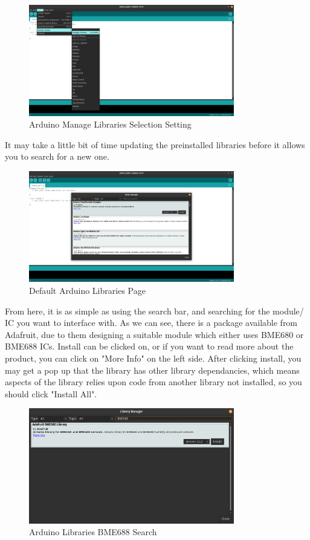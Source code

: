 \documentclass[a4paper,11pt]{report}
\begin{document}
\begin{figure}[H]
\centering
\includegraphics[width=0.8\textwidth]{screenshots/arduinomanagelibrariesselect}
\caption{Arduino Manage Libraries Selection Setting}
\end{figure}

It may take a little bit of time updating the preinstalled libraries before it allows you to search for a new one.

\begin{figure}[H]
\centering
\includegraphics[width=0.8\textwidth]{screenshots/arduinolibrariespage}
\caption{Default Arduino Libraries Page}
\end{figure}

From here, it is as simple as using the search bar, and searching for the module/ IC you want to interface with. As we can see, there is a package available from Adafruit, due to them designing a suitable module which either uses BME680 or BME688 ICs. Install can be clicked on, or if you want to read more about the product, you can click on "More Info" on the left side. After clicking install, you may get a pop up that the library has other library dependancies, which means aspects of the library relies upon code from another library not installed, so you should click "Install All".

\begin{figure}[H]
\centering
\includegraphics[width=0.8\textwidth]{screenshots/arduinolibrariessearch}
\caption{Arduino Libraries BME688 Search}
\end{figure}
\end{document}
